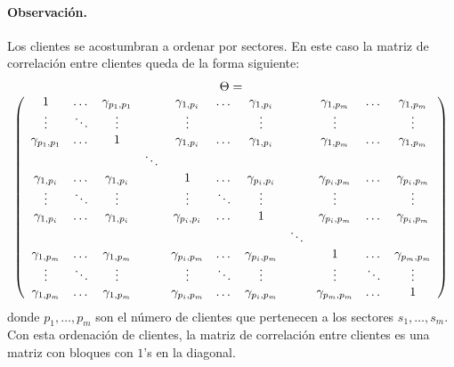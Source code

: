\paragraph{Observaci\'on.} Los clientes se acostumbran a ordenar por sectores. En este
caso la matriz de correlaci\'on entre clientes queda de la forma siguiente:
\begin{displaymath}
\begin{array}{c}
\Theta = \\
\left(
\begin{array}{ccccccccccc}
1                & \dots    & \gamma_{p_1,p_1}  &          & \gamma_{1,p_i}   & \dots   & \gamma_{1,p_i}    &         & \gamma_{1,p_m}   & \dots      & \gamma_{1,p_m}   \cr
\vdots           & \ddots   & \vdots            &          & \vdots           &         & \vdots            &         & \vdots           &            & \vdots           \cr
\gamma_{p_1,p_1} & \dots    & 1                 &          & \gamma_{1,p_i}   & \dots   & \gamma_{1,p_i}    &         & \gamma_{1,p_m}   & \dots      & \gamma_{1,p_m}   \cr

                 &          &                   & \ddots   &                  &         &                   &         &                  &            &                  \cr

\gamma_{1,p_i}   & \dots    & \gamma_{1,p_i}    &          & 1                & \dots   & \gamma_{p_i,p_i}  &         & \gamma_{p_i,p_m} & \dots      & \gamma_{p_i,p_m} \cr
\vdots           & \ddots   & \vdots            &          & \vdots           & \ddots  & \vdots            &         & \vdots           &            & \vdots           \cr
\gamma_{1,p_i}   & \dots    & \gamma_{1,p_i}    &          & \gamma_{p_i,p_i} & \dots   & 1                 &         & \gamma_{p_i,p_m} & \dots      & \gamma_{p_i,p_m} \cr

                 &          &                   &          &                  &         &                   & \ddots  &                  &            &                  \cr

\gamma_{1,p_m}   & \dots    & \gamma_{1,p_m}    &          & \gamma_{p_i,p_m} & \dots   & \gamma_{p_i,p_m}  &         & 1                & \dots      & \gamma_{p_m,p_m} \cr
\vdots           & \ddots   & \vdots            &          & \vdots           & \ddots  & \vdots            &         & \vdots           & \ddots     & \vdots           \cr
\gamma_{1,p_m}   & \dots    & \gamma_{1,p_m}    &          & \gamma_{p_i,p_m} & \dots   & \gamma_{p_i,p_m}  &         & \gamma_{p_m,p_m} & \dots      & 1               
\end{array}
\right)
\end{array}
\end{displaymath}
donde $p_1, \dots, p_m$ son el n\'umero de clientes que pertenecen a los sectores
$s_1, \dots, s_m$. Con esta ordenaci\'on de clientes, la matriz de correlaci\'on entre
clientes es una matriz con bloques con $1$'s en la diagonal.


